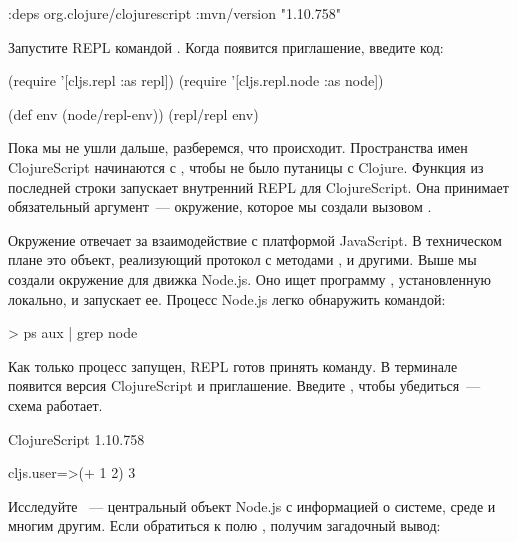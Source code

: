 \begin{english}
  \begin{clojure}
{:deps
 {org.clojure/clojurescript {:mvn/version "1.10.758"}}}
  \end{clojure}
\end{english}

Запустите REPL командой . Когда появится приглашение, введите код:

\begin{english}
  \begin{clojure}
(require '[cljs.repl :as repl])
(require '[cljs.repl.node :as node])

(def env (node/repl-env))
(repl/repl env)
  \end{clojure}
\end{english}

Пока мы не ушли дальше, разберемся, что происходит. Пространства имен ClojureScript начинаются с , чтобы не было путаницы с Clojure. Функция  из последней строки запускает внутренний REPL для ClojureScript. Она принимает обязательный аргумент~--- окружение, которое мы создали вызовом .

Окружение отвечает за взаимодействие с платформой JavaScript. В техническом плане это объект, реализующий протокол  с методами ,  и другими. Выше мы создали окружение для движка Node.js. Оно ищет программу , установленную локально, и запускает ее. Процесс Node.js легко обнаружить командой:

\begin{english}
  \begin{bash}
> ps aux | grep node
  \end{bash}
\end{english}

Как только процесс запущен, REPL готов принять команду. В терминале появится версия ClojureScript и приглашение. Введите , чтобы убедиться~--- схема работает.

\begin{english}
  \begin{text}
ClojureScript 1.10.758

cljs.user=>(+ 1 2)
3
  \end{text}
\end{english}

Исследуйте ~--- центральный объект Node.js с информацией о системе, среде и многим другим. Если обратиться к полю , получим загадочный вывод:

